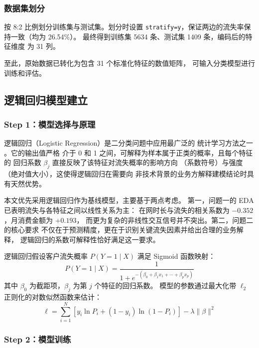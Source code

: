 \subsubsection*{数据集划分}

按 8:2 比例划分训练集与测试集。划分时设置
\texttt{stratify=y}，保证两边的流失率保持一致（均为 26.54\%）。
最终得到训练集 5634 条、测试集 1409 条，编码后的特征维度
为 31 列。

至此，原始数据已转化为包含 31 个标准化特征的数值矩阵，
可输入分类模型进行训练和评估。

\subsection{逻辑回归模型建立}

\subsubsection*{Step 1：模型选择与原理}

逻辑回归（Logistic Regression）是二分类问题中应用最广泛的
统计学习方法之一 \cite{hosmer2013applied}。它的输出值严格
介于 0 和 1 之间，可解释为样本属于正类的概率，且每个特征的
回归系数 $\beta_j$ 直接反映了该特征对流失概率的影响方向
（系数符号）与强度（绝对值大小），这使得逻辑回归在需要向
非技术背景的业务方解释建模结论时具有天然优势。

本文优先采用逻辑回归作为基线模型，主要基于两点考虑。
第一，问题一的 EDA 已表明流失与各特征之间以线性关系为主：
在网时长与流失的相关系数为 $-0.352$，月消费金额为 $+0.193$，
而更为复杂的非线性交互信号并不突出。第二，问题二的核心要求
不仅在于预测精度，更在于识别关键流失因素并给出合理的业务解释，
逻辑回归的系数可解释性恰好满足这一要求。

逻辑回归假设客户流失概率 $P(Y=1 \mid X)$ 满足 Sigmoid 函数映射：
\begin{equation}
    P(Y=1 \mid X)
    = \frac{1}{1 + e^{-(\beta_0 + \beta_1 x_1 + \cdots + \beta_p x_p)}}
    \label{eq:sigmoid}
\end{equation}
其中 $\beta_0$ 为截距项，$\beta_j$ 为第 $j$ 个特征的回归系数。
模型的参数通过最大化带 $\ell_2$ 正则化的对数似然函数来估计：
\begin{equation}
    \ell = \sum_{i=1}^{N} \left[
        y_i \ln P_i + (1 - y_i) \ln (1 - P_i)
    \right] - \lambda \|\beta\|^2
    \label{eq:loglik}
\end{equation}

\subsubsection*{Step 2：模型训练}

